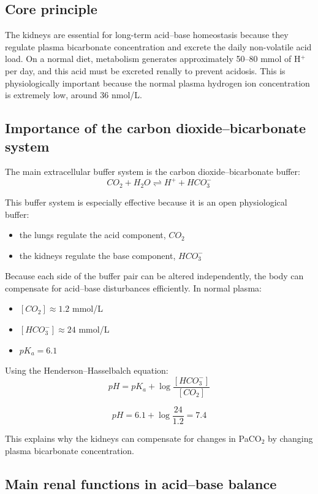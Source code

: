 \documentclass[11pt,a4paper]{article}
\begin{document}
\subsection{Core principle}

The kidneys are essential for long-term acid--base homeostasis because they regulate plasma bicarbonate concentration and excrete the daily non-volatile acid load. On a normal diet, metabolism generates approximately 50--80 mmol of H$^+$ per day, and this acid must be excreted renally to prevent acidosis. This is physiologically important because the normal plasma hydrogen ion concentration is extremely low, around 36 nmol/L.

\subsection{Importance of the carbon dioxide--bicarbonate system}

The main extracellular buffer system is the carbon dioxide--bicarbonate buffer:
\[
CO_2 + H_2O \rightleftharpoons H^+ + HCO_3^-
\]

This buffer system is especially effective because it is an open physiological buffer:
\begin{itemize}
    \item the lungs regulate the acid component, $CO_2$
    \item the kidneys regulate the base component, $HCO_3^-$
\end{itemize}

Because each side of the buffer pair can be altered independently, the body can compensate for acid--base disturbances efficiently. In normal plasma:
\begin{itemize}
    \item $[CO_2] \approx 1.2$ mmol/L
    \item $[HCO_3^-] \approx 24$ mmol/L
    \item $pK_a = 6.1$
\end{itemize}

Using the Henderson--Hasselbalch equation:
\[
pH = pK_a + \log \frac{[HCO_3^-]}{[CO_2]}
\]

\[
pH = 6.1 + \log \frac{24}{1.2} = 7.4
\]

This explains why the kidneys can compensate for changes in PaCO$_2$ by changing plasma bicarbonate concentration.

\subsection{Main renal functions in acid--base balance}
\end{document}
